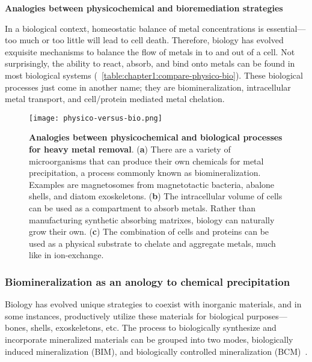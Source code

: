 \documentclass[../main/main]{subfiles}
\begin{document}
\begin{table}[H]
\small
\centering
	
	\caption[Analogies between physicochemical and bioremediation strategies]
	{
		\textbf{Analogies between physicochemical and bioremediation strategies}
	}
	\label{table:chapter1:compare-physico-bio}
\end{table}

In a biological context, homeostatic balance of metal concentrations is essential---too much or too little will lead to cell death. Therefore, biology has evolved exquisite mechanisms to balance the flow of metals in to and out of a cell. Not surprisingly, the ability to react, absorb, and bind onto metals can be found in most biological systems (\TABLE~\ref{table:chapter1:compare-physico-bio}). These biological processes just come in another name; they are biomineralization, intracellular metal transport, and cell/protein mediated metal chelation.

\begin{figure}[H]
	\centering
	\texttt{[image: physico-versus-bio.png]}
	\caption[Analogies between physicochemical and biological processes for heavy metal removal]
	{
		\textbf{Analogies between physicochemical and biological processes for heavy metal removal}.
    (\textbf{a}) There are a variety of microorganisms that can produce their own chemicals for metal precipitation, a process commonly known as biomineralization. Examples are magnetosomes from magnetotactic bacteria, abalone shells, and diatom exoskeletons.
    (\textbf{b}) The intracellular volume of cells can be used as a compartment to absorb metals. Rather than manufacturing synthetic absorbing matrixes, biology can naturally grow their own.
    (\textbf{c}) The combination of cells and proteins can be used as a physical substrate to chelate and aggregate metals, much like in ion-exchange.
	}
	\label{figure:chapter1:physico-versus-bio}
\end{figure}
\clearpage %

\subsubsection*{Biomineralization as an anology to chemical precipitation}
Biology has evolved unique strategies to coexist with inorganic materials, and in some instances, productively utilize these materials for biological purposes---bones, shells, exoskeletons, etc. The process to biologically synthesize and incorporate mineralized materials can be grouped into two modes, biologically induced mineralization (BIM), and biologically controlled mineralization (BCM)~\cite{frankel2003biologically}.
\end{document}
